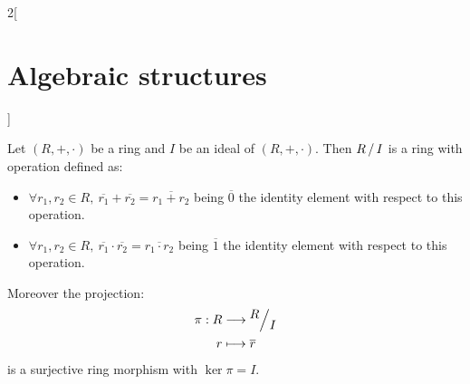 \documentclass[class=article,10pt,crop=false]{standalone}
\begin{document}
\begin{multicols}{2}[\section{Algebraic structures}]
\begin{definition}
\end{definition}
\begin{prop}
Let $(R,+,\cdot)$ be a ring and $I$ be an ideal of $(R,+,\cdot)$. Then $\quot{R}{I}$ is a ring with operation defined as:
\begin{itemize}
    \item $\forall r_1,r_2\in R,\ \overline{r_1}+\overline{r_2}=\overline{r_1+r_2}$ being $\overline{0}$ the identity element with respect to this operation.
    \item $\forall r_1,r_2\in R,\ \overline{r_1}\cdot\overline{r_2}=\overline{r_1\cdot r_2}$ being $\overline{1}$ the identity element with respect to this operation.
\end{itemize}
Moreover the projection:
\begin{align*}
    \pi:R&\longrightarrow\quot{R}{I}\\
    r&\longmapsto\overline{r}
\end{align*}
is a surjective ring morphism with $\ker\pi=I$.
\end{prop}
\end{multicols}
\end{document}
